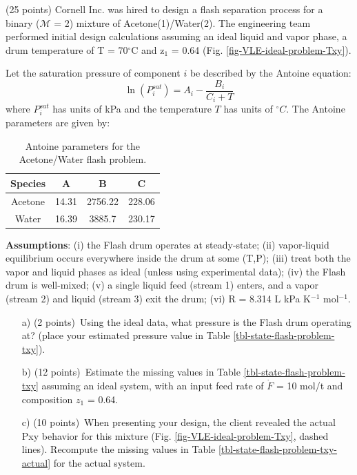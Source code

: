 \item{(25 points)
Cornell Inc. was hired to design a flash separation process for a binary ($\mathcal{M}$ = 2) mixture of Acetone(1)/Water(2).
The engineering team performed initial design calculations assuming an ideal liquid and vapor phase, a drum temperature of T = 70$^{\circ}$C and z$_{1}$ = 0.64
(Fig. \ref{fig-VLE-ideal-problem-Txy}). 

Let the saturation pressure of component $i$ be described by the Antoine equation:
\begin{equation}
  \ln\left(P_{i}^{sat}\right) = A_{i} - \frac{B_{i}}{C_{i}+T}
\end{equation}where $P_{i}^{sat}$ has units of kPa and the temperature $T$ has units of $^{\circ}C$.
The Antoine parameters are given by:

\begin{table}[!ht]
  \centering
  \caption{Antoine parameters for the Acetone/Water flash problem.}
  \setlength{\tabcolsep}{18pt}
  \begin{tabular}{c|c|c|c}\toprule
    Species & A & B & C \\ \toprule
    Acetone & 14.31 & 2756.22 & 228.06 \\
    Water & 16.39 & 3885.7 & 230.17 \\\bottomrule
  \end{tabular}
\end{table}

\textbf{Assumptions}: (i) the Flash drum operates at steady-state;
(ii) vapor-liquid equilibrium occurs everywhere inside the drum at some (T,P);
(iii) treat both the vapor and liquid phases as ideal (unless using experimental data);
(iv) the Flash drum is well-mixed;
(v) a single liquid feed (stream 1) enters, and a vapor (stream 2) and liquid (stream 3) exit the drum;
(vi) R = 8.314 L kPa K$^{-1}$ mol$^{-1}$.

\begin{itemize}
    \item[a)]{(2 points)~Using the ideal data, what pressure is the Flash drum operating at? (place your estimated pressure value in Table
    \ref{tbl-state-flash-problem-txy}).}
    \item[b)]{(12 points)~Estimate the missing values in Table \ref{tbl-state-flash-problem-txy} assuming an ideal system, with an input feed rate of $\dot{F}$ = 10 mol/t and composition $z_{1}$ = 0.64.}
    \item[c)]{(10 points)~When presenting your design, the client revealed the actual Pxy behavior for this mixture (Fig. \ref{fig-VLE-ideal-problem-Txy}, dashed lines). 
    Recompute the missing values in Table \ref{tbl-state-flash-problem-txy-actual} for the actual system.}
  \end{itemize}

}
